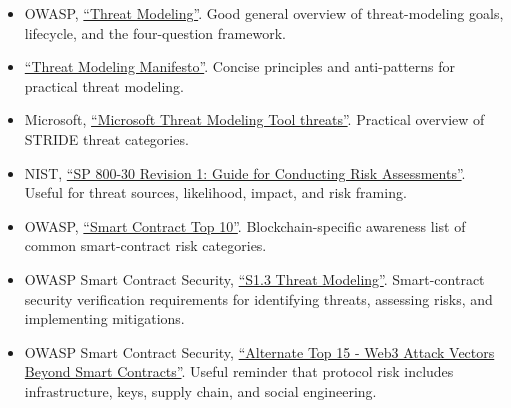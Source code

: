 \begin{itemize}
\tightlist
\item
  OWASP, \href{https://owasp.org/www-community/Threat_Modeling}{``Threat
  Modeling''}. Good general overview of threat-modeling goals,
  lifecycle, and the four-question framework.
\item
  \href{https://www.threatmodelingmanifesto.org/}{``Threat Modeling
  Manifesto''}. Concise principles and anti-patterns for practical
  threat modeling.
\item
  Microsoft,
  \href{https://learn.microsoft.com/en-us/azure/security/develop/threat-modeling-tool-threats}{``Microsoft
  Threat Modeling Tool threats''}. Practical overview of STRIDE threat
  categories.
\item
  NIST,
  \href{https://nvlpubs.nist.gov/nistpubs/Legacy/SP/nistspecialpublication800-30r1.pdf}{``SP
  800-30 Revision 1: Guide for Conducting Risk Assessments''}. Useful
  for threat sources, likelihood, impact, and risk framing.
\item
  OWASP,
  \href{https://owasp.org/www-project-smart-contract-top-10/}{``Smart
  Contract Top 10''}. Blockchain-specific awareness list of common
  smart-contract risk categories.
\item
  OWASP Smart Contract Security,
  \href{https://scs.owasp.org/SCSVS/controls/SCSVS-ARCH-3/}{``S1.3
  Threat Modeling''}. Smart-contract security verification requirements
  for identifying threats, assessing risks, and implementing
  mitigations.
\item
  OWASP Smart Contract Security,
  \href{https://scs.owasp.org/sctop10/Web3-Attack-Vectors-Top15/}{``Alternate
  Top 15 - Web3 Attack Vectors Beyond Smart Contracts''}. Useful
  reminder that protocol risk includes infrastructure, keys, supply
  chain, and social engineering.
\end{itemize}
